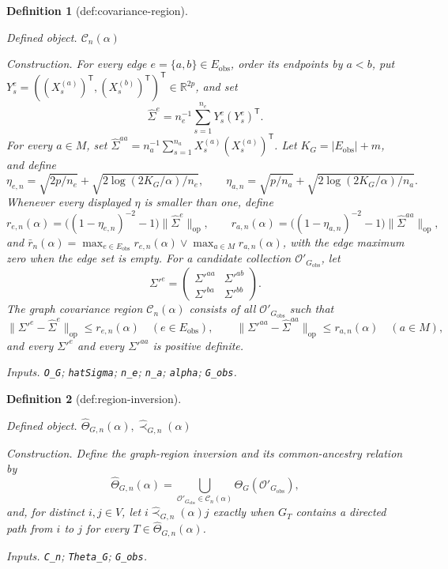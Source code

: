 \documentclass{article}
\newtheorem{definition}{Definition}
\begin{document}
\begin{definition}[def:covariance-region]\label{def:covariance-region}
\par\smallskip\noindent\emph{Defined object.} \(\mathcal C_n(\alpha)\)
\par\smallskip\noindent\emph{Construction.} For every edge \(e=\{a,b\}\in E_{\mathrm{obs}}\), order its endpoints by \(a<b\), put \(Y_s^e=((X_s^{(a)})^{\mathsf T},(X_s^{(b)})^{\mathsf T})^{\mathsf T}\in\mathbb R^{2p}\), and set
\[
\widehat\Sigma^e=n_e^{-1}\sum_{s=1}^{n_e}Y_s^e(Y_s^e)^{\mathsf T}.
\]
For every \(a\in M\), set \(\widehat\Sigma^{aa}=n_a^{-1}\sum_{s=1}^{n_a}X_s^{(a)}(X_s^{(a)})^{\mathsf T}\).  Let \(K_G=|E_{\mathrm{obs}}|+m\), and define
\[
\eta_{e,n}=\sqrt{2p/n_e}+\sqrt{2\log(2K_G/\alpha)/n_e},
\qquad
\eta_{a,n}=\sqrt{p/n_a}+\sqrt{2\log(2K_G/\alpha)/n_a}.
\]
Whenever every displayed \(\eta\) is smaller than one, define
\[
r_{e,n}(\alpha)=\bigl((1-\eta_{e,n})^{-2}-1\bigr)\|\widehat\Sigma^e\|_{\mathrm{op}},
\qquad
r_{a,n}(\alpha)=\bigl((1-\eta_{a,n})^{-2}-1\bigr)\|\widehat\Sigma^{aa}\|_{\mathrm{op}},
\]
and \(\bar r_n(\alpha)=\max_{e\in E_{\mathrm{obs}}}r_{e,n}(\alpha)\vee\max_{a\in M}r_{a,n}(\alpha)\), with the edge maximum zero when the edge set is empty.  For a candidate collection \(\mathcal O'_{G_{\mathrm{obs}}}\), let
\[
\Sigma'^e=
\begin{pmatrix}
\Sigma'^{aa}&\Sigma'^{ab}\\
\Sigma'^{ba}&\Sigma'^{bb}
\end{pmatrix}.
\]
The graph covariance region \(\mathcal C_n(\alpha)\) consists of all \(\mathcal O'_{G_{\mathrm{obs}}}\) such that
\[
\|\Sigma'^e-\widehat\Sigma^e\|_{\mathrm{op}}\le r_{e,n}(\alpha)\quad(e\in E_{\mathrm{obs}}),
\qquad
\|\Sigma'^{aa}-\widehat\Sigma^{aa}\|_{\mathrm{op}}\le r_{a,n}(\alpha)\quad(a\in M),
\]
and every \(\Sigma'^e\) and every \(\Sigma'^{aa}\) is positive definite.
\par\smallskip\noindent\emph{Inputs.} \texttt{O\_\allowbreak{}G}; \texttt{hatSigma}; \texttt{n\_\allowbreak{}e}; \texttt{n\_\allowbreak{}a}; \texttt{alpha}; \texttt{G\_\allowbreak{}obs}.
\end{definition}

\begin{definition}[def:region-inversion]\label{def:region-inversion}
\par\smallskip\noindent\emph{Defined object.} \(\widehat\Theta_{G,n}(\alpha),\widehat\prec_{G,n}(\alpha)\)
\par\smallskip\noindent\emph{Construction.} Define the graph-region inversion and its common-ancestry relation by
\[
\widehat\Theta_{G,n}(\alpha)=
\bigcup_{\mathcal O'_{G_{\mathrm{obs}}}\in\mathcal C_n(\alpha)}
\Theta_G(\mathcal O'_{G_{\mathrm{obs}}}),
\]
and, for distinct \(i,j\in V\), let \(i\widehat\prec_{G,n}(\alpha)j\) exactly when \(G_T\) contains a directed path from \(i\) to \(j\) for every \(T\in\widehat\Theta_{G,n}(\alpha)\).
\par\smallskip\noindent\emph{Inputs.} \texttt{C\_\allowbreak{}n}; \texttt{Theta\_\allowbreak{}G}; \texttt{G\_\allowbreak{}obs}.
\end{definition}
\end{document}
